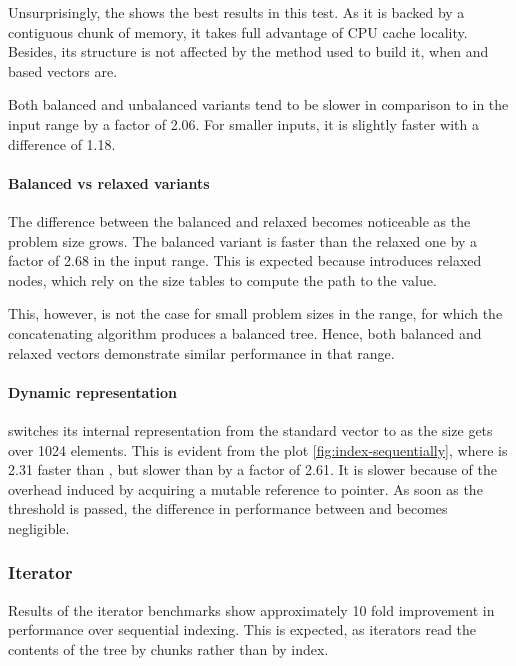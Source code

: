 Unsurprisingly, the \stdvec{} shows the best results in this test. As it is backed by a contiguous chunk of memory, it takes full advantage of CPU cache locality. Besides, its structure is not affected by the method used to build it, when \rbtree{} and \rrbtree{} based vectors are.

Both balanced and unbalanced \imrsvec{} variants tend to be slower in comparison to \rrbvec{} in the \range{[100, \mega{1}]} input range by a factor of 2.06. For smaller inputs, \rrbvec{} it is slightly faster with a difference of 1.18. 

\paragraph{Balanced vs relaxed variants}
The difference between the balanced \rbvec{} and relaxed \rrbvec{} becomes noticeable as the problem size grows. The balanced variant is faster than the relaxed one by a factor of 2.68 in the \range{[100, \mega{1}]} input range. This is expected because \rrbvec{} introduces relaxed nodes, which rely on the size tables to compute the path to the value. 

This, however, is not the case for small problem sizes in the \range{[0, 100]} range, for which the concatenating algorithm produces a balanced tree. Hence, both balanced and relaxed vectors demonstrate similar performance in that range. 

\paragraph{Dynamic representation}
\pvec{} switches its internal representation from the standard vector to \rrbvec{} as the size gets over 1024 elements. This is evident from the plot \ref{fig:index-sequentially}, where \pvec{} is 2.31 faster than \rbvec{}, but slower than \stdvec{} by a factor of 2.61. It is slower because of the overhead induced by acquiring a mutable reference to \rc{} pointer. As soon as the threshold is passed, the difference in performance between \pvec{} and \rrbvec{} becomes negligible. 

\subsubsection*{Iterator}
Results of the iterator benchmarks show approximately 10 fold improvement in performance over sequential indexing. This is expected, as iterators read the contents of the tree by chunks rather than by index. 

